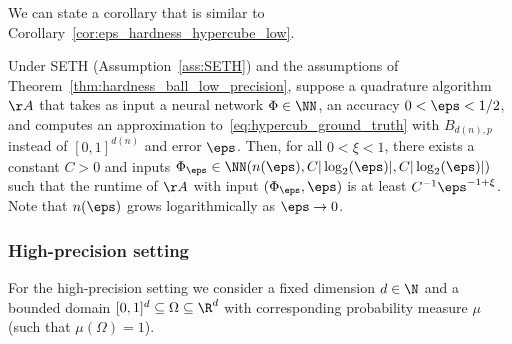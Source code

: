 \documentclass{amsart}[11pt]
\numberwithin{equation}{section}
\numberwithin{theorem}{section}
\begin{document}
We can state a corollary that is similar to Corollary~\ref{cor:eps_hardness_hypercube_low}.

\begin{corollary}\label{cor:general_eps_hardness_hypercube_low}
    Under SETH (Assumption~\ref{ass:SETH}) and the assumptions of Theorem~\ref{thm:hardness_ball_low_precision}, suppose a quadrature algorithm $\AA$ that takes as input a neural network $\Phi \in \NN$, an accuracy $0 < \eps < 1/2$, and computes an approximation to~\eqref{eq:hypercub_ground_truth} with $B_{d(n), p}$ instead of $[0, 1]^{d(n)}$ and error $\eps$. Then, for all $0 < \xi < 1$, there exists a constant $C > 0$ and inputs $\Phi_\eps\in \NN(n(\eps),C |\log_2(\eps)|, C |\log_2(\eps)|)$ such that the runtime of $\AA$ with input $(\Phi_\eps,\eps)$ is at least $C^{-1} \eps^{-1+\xi}$. Note that $n(\eps)$ grows logarithmically as $\eps \to 0$. 
\end{corollary}

\subsubsection{High-precision setting}

For the high-precision setting we consider a fixed dimension $d \in \N$ and a bounded domain $[0, 1]^d \subseteq \Omega \subseteq \R^d$ with corresponding probability measure $\mu$ (such that $\mu(\Omega) = 1$). 
\end{document}
